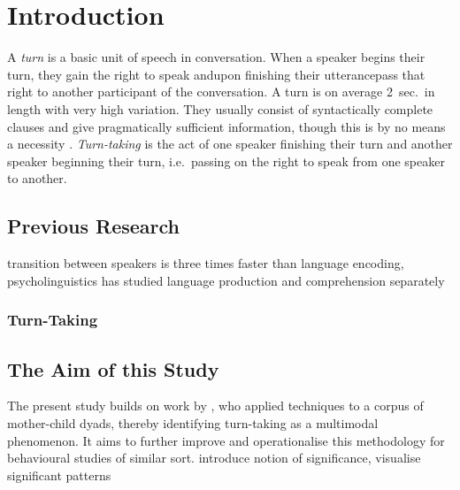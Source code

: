 
\chapter{Introduction}
A \emph{turn} is a basic unit of speech in conversation. When a speaker begins their turn, they gain the right to speak and\dash upon finishing their utterance\dash pass that right to another participant of the conversation. A turn is on average 2~sec.\ in length with very high variation. They usually consist of syntactically complete clauses and give pragmatically sufficient information, though this is by no means a necessity \cite[]{levinson16}. \emph{Turn-taking} is the act of one speaker finishing their turn and another speaker beginning their turn, i.e.\ passing on the right to speak from one speaker to another.

\section{Previous Research}
\cite{levinson16} transition between speakers is three times faster than language encoding, psycholinguistics has studied language production and comprehension separately

\subsection{Turn-Taking}

\subsection{\fpm}



\section{The Aim of this Study}
The present study builds on work by , who applied \fpm{} techniques to a corpus of mother-child dyads, thereby identifying turn-taking as a multimodal phenomenon. It aims to further improve and operationalise this methodology for behavioural studies of similar sort.
introduce notion of significance, visualise significant patterns


























